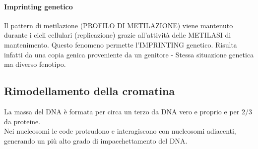 \documentclass{article}
\begin{document}
\paragraph{Imprinting genetico}
Il pattern di metilazione (PROFILO DI METILAZIONE) viene mantenuto durante i cicli cellulari (replicazione)
grazie all'attività delle METILASI di mantenimento. Questo fenomeno permette l'IMPRINTING genetico. Risulta infatti da una copia genica proveniente da un
genitore - Stessa situazione genetica ma diverso fenotipo.
\subsection{Rimodellamento della cromatina}
La massa del DNA è formata per circa un terzo da DNA vero e proprio e per 2/3 da proteine.\\
Nei nucleosomi le code protrudono e interagiscono con nucleosomi adiacenti, generando un più alto grado di impacchettamento del DNA.\\
\end{document}
